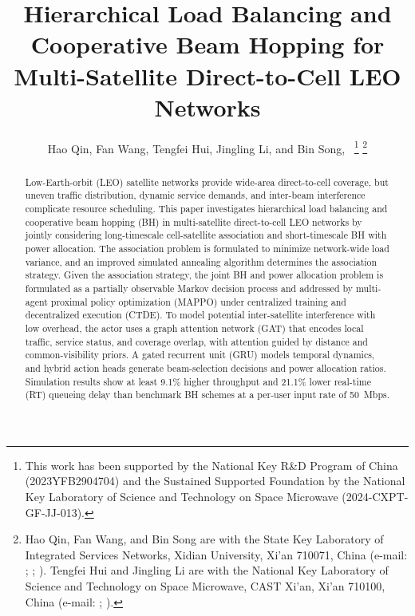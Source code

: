 \documentclass[journal]{IEEEtran}
\newcommand{\revbegin}[1]{\color{revisionblue}\ignorespaces}
\newcommand{\revend}[1]{\color{black}\ignorespaces}
\begin{document}
\title{Hierarchical Load Balancing and Cooperative Beam Hopping for Multi-Satellite Direct-to-Cell LEO Networks}

\author{Hao Qin, Fan Wang, Tengfei Hui, Jingling Li, and Bin Song,~%
\thanks{This work has been supported by the National Key R\&D Program of China (2023YFB2904704) and the Sustained Supported Foundation by the National Key Laboratory of Science and Technology on Space Microwave (2024-CXPT-GF-JJ-013).}%
\thanks{Hao Qin, Fan Wang, and Bin Song are with the State Key Laboratory of Integrated Services Networks, Xidian University, Xi'an 710071, China (e-mail: \HaoQinEmail; \FanWangEmail; \BinSongEmail). Tengfei Hui and Jingling Li are with the National Key Laboratory of Science and Technology on Space Microwave, CAST Xi'an, Xi'an 710100, China (e-mail: \TengfeiHuiEmail; \JinglingLiEmail).}%
}



\maketitle
\begin{abstract}
\revbegin{}Low-Earth-orbit (LEO) satellite networks provide wide-area direct-to-cell coverage, but uneven traffic distribution, dynamic service demands, and inter-beam interference complicate resource scheduling. This paper investigates hierarchical load balancing and cooperative beam hopping (BH) in multi-satellite direct-to-cell LEO networks by jointly considering long-timescale cell-satellite association and short-timescale BH with power allocation. The association problem is formulated to minimize network-wide load variance, and an improved simulated annealing algorithm determines the association strategy. Given the association strategy, the joint BH and power allocation problem is formulated as a partially observable Markov decision process and addressed by multi-agent proximal policy optimization (MAPPO) under centralized training and decentralized execution (CTDE). To model potential inter-satellite interference with low overhead, the actor uses a graph attention network (GAT) that encodes local traffic, service status, and coverage overlap, with attention guided by distance and common-visibility priors. A gated recurrent unit (GRU) models temporal dynamics, and hybrid action heads generate beam-selection decisions and power allocation ratios. Simulation results show at least 9.1\% higher throughput and 21.1\% lower real-time (RT) queueing delay than benchmark BH schemes at a per-user input rate of 50~Mbps.\revend{}

\end{abstract}
\end{document}
